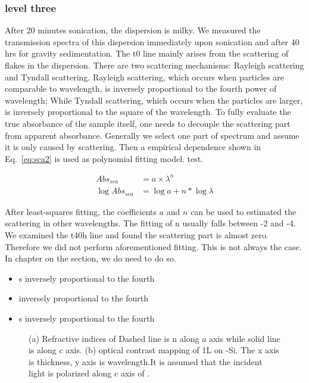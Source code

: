 \documentclass[12pt,oneside]{book}
\begin{document}
\subsubsection{level three}
After 20 minutes sonication, the dispersion is milky. We measured the transmission spectra of this dispersion immediately upon sonication and after 40 hrs for gravity sedimentation. The t0 line mainly arises from the scattering of flakes in the dispersion. There are two scattering mechanisms: Rayleigh scattering and Tyndall scattering. Rayleigh scattering, which occurs when particles are comparable to wavelength, is inversely proportional to the fourth power of wavelength; While Tyndall scattering, which occurs when the particles are larger, is inversely proportional to the square of the wavelength. To fully evaluate the true absorbance of the sample itself, one needs to decouple the scattering part from apparent absorbance. Generally we select one part of spectrum and assume it is only caused by scattering. Then a empirical dependence shown in Eq.~\ref{eq:sca2} is used as polynomial fitting model. test.

\begin{align}
Abs_{sca}  & = a\times \lambda^{n}  \label{eq:sca1}\\
\log{Abs_{sca}} & = \log{a} + n*\log{\lambda} \label{eq:sca2}
\end{align}

After least-squares fitting, the coefficients $a$ and $n$ can be used to estimated the scattering in other wavelengths. The fitting of n usually falls between -2 and -4. We examined the t40h line and found the scattering part is almost zero. Therefore we did not perform aforementioned fitting. This is not always the case. In chapter on the  section, we do need to do so.

\begin{itemize}
\item s inversely proportional to the fourth
\item  inversely proportional to the fourth
\item s inversely proportional to the fourth
\end{itemize}

\begin{figure}[htb]
\centering
{}%
\caption[Refractive indices of ]{(a) Refractive indices of  Dashed line is n along $a$ axis while solid line is along $c$ axis. (b) optical contrast mapping of 1L  on -Si. The x axis is  thickness, y axis is wavelength.It is assumed that the incident light is polarized along c axis of .}
\label{fig:mofl}
\end{figure}
\end{document}
